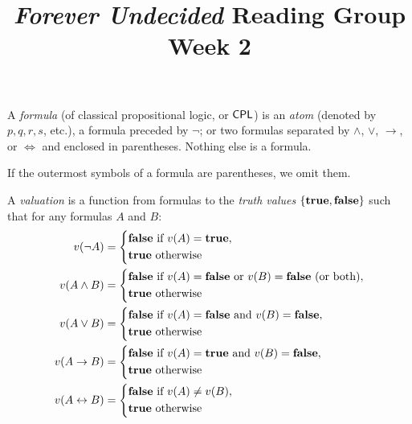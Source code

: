 \documentclass{article}
\title{\emph{Forever Undecided} Reading Group \\ Week 2}
\date{}
\author{}
\begin{document}
\maketitle

\begin{definition}
    A \emph{formula} (of classical propositional logic, or $\mathsf{CPL}$) is an \emph{atom} (denoted by $p, q, r, s$, etc.), a formula preceded by $\neg$; or two formulas separated by $\wedge$, $\vee$, $\to$, or $\iff$ and enclosed in parentheses. Nothing else is a formula.
\end{definition}

\begin{notation}
    If the outermost symbols of a formula are parentheses, we omit them.
\end{notation}

\begin{definition}
    A \emph{valuation} is a function from formulas to the \emph{truth values} $\{ \mathbf{true}, \mathbf{false} \}$ such that for any formulas $A$ and $B$:
    \begin{align*}
        v(\neg A) & = \begin{dcases} \mathbf{false} \textrm{ if } v(A) = \mathbf{true}, \\ \mathbf{true} \textrm{ otherwise} \end{dcases} \\
        v(A \wedge B) & = \begin{dcases} \mathbf{false} \textrm{ if } v(A) = \mathbf{false} \textrm{ or } v(B) = \mathbf{false} \textrm{ (or both)}, \\ \mathbf{true} \textrm{ otherwise} \end{dcases} \\
        v(A \vee B) & = \begin{dcases} \mathbf{false} \textrm{ if } v(A) = \mathbf{false} \textrm{ and } v(B) = \mathbf{false}, \\ \mathbf{true} \textrm{ otherwise} \end{dcases} \\
        v(A \to B) & = \begin{dcases} \mathbf{false} \textrm{ if } v(A) = \mathbf{true} \textrm{ and } v(B) = \mathbf{false}, \\ \mathbf{true} \textrm{ otherwise}  \end{dcases} \\
        v(A \leftrightarrow B) & = \begin{dcases} \mathbf{false} \textrm{ if } v(A) \neq v(B), \\ \mathbf{true} \textrm{ otherwise} \end{dcases}
    \end{align*}
\end{definition}
\end{document}
